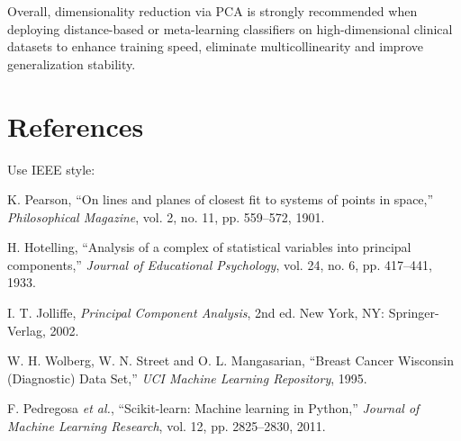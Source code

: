 \documentclass[12pt,a4paper]{article}
\begin{document}
Overall, dimensionality reduction via PCA is strongly recommended when deploying distance-based or meta-learning classifiers on high-dimensional clinical datasets to enhance training speed, eliminate multicollinearity and improve generalization stability.

\section{References}
Use IEEE style:
\begin{enumerate}[label={[\arabic*]}]
\item K. Pearson, ``On lines and planes of closest fit to systems of points in space,'' \textit{Philosophical Magazine}, vol. 2, no. 11, pp. 559--572, 1901.
\item H. Hotelling, ``Analysis of a complex of statistical variables into principal components,'' \textit{Journal of Educational Psychology}, vol. 24, no. 6, pp. 417--441, 1933.
\item I. T. Jolliffe, \textit{Principal Component Analysis}, 2nd ed. New York, NY: Springer-Verlag, 2002.
\item W. H. Wolberg, W. N. Street and O. L. Mangasarian, ``Breast Cancer Wisconsin (Diagnostic) Data Set,'' \textit{UCI Machine Learning Repository}, 1995.
\item F. Pedregosa \textit{et al.}, ``Scikit-learn: Machine learning in Python,'' \textit{Journal of Machine Learning Research}, vol. 12, pp. 2825--2830, 2011.
\end{enumerate}
\end{document}

